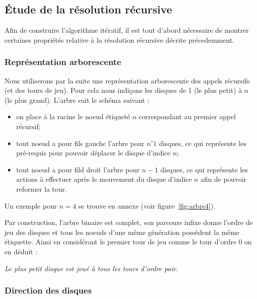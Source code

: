 \documentclass[a4paper,13pt]{article}
\begin{document}
\subsection{Étude de la résolution récursive}

Afin de construire l'algorithme itératif, il est tout d'abord nécessaire de montrer certaines propriétés relative à la résolution récursive décrite précedemment.

\subsubsection{Représentation arborescente}

Nous utiliserons par la suite une représentation arborescente des appels récursifs (et des tours de jeu). Pour cela nous indiçons les disques de 1 (le plus petit) à $n$ (le plus grand).
L'arbre suit le schéma suivant :
\begin{itemize}
  \item on place à la racine le noeud étiqueté $n$ correspondant au premier appel récursif;
  \item tout noeud a pour fils gauche l'arbre pour $n⁻1$ disques, ce qui représente les pré-requis pour pouvoir déplacer le disque d'indice $n$;
  \item tout noeud a pour fild droit l'arbre pour $n-1$ disques, ce qui représente les actions à effectuer après le mouvement du disque d'indice $n$ afin de pouvoir reformer la tour.
\end{itemize}

Un exemple pour $n=4$ se trouve en annexe (voir figure~\ref{fig:arbre4}).
\bigskip

Par construction, l'arbre binaire est complet, son parcours infixe donne l'ordre de jeu des disques et tous les noeuds d'une même génération possèdent la même étiquette. Ainsi en considérant le premier tour de jeu comme le tour d'ordre 0 on en déduit :
\begin{center}
  \emph{Le plus petit disque est joué à tous les tours d'ordre pair.}
\end{center}

\subsubsection{Direction des disques}
\end{document}
